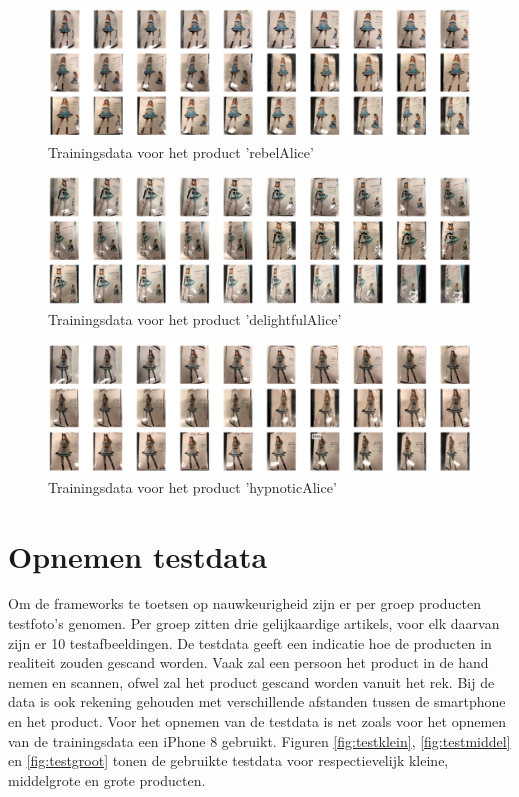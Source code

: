   \begin{figure}[h!]
    \centering
        \includegraphics[width=1\textwidth]{img/rebelAlice.png}
    \caption{Trainingsdata voor het product 'rebelAlice'}
    \label{fig:rebelAlice}
  \end{figure}

  \begin{figure}[h!]
    \centering
        \includegraphics[width=1\textwidth]{img/delightfulAlice.png}
    \caption{Trainingsdata voor het product 'delightfulAlice'}
    \label{fig:delightfulAlice}
  \end{figure}

  \begin{figure}[h!]
    \centering
        \includegraphics[width=1\textwidth]{img/hypnoticAlice.png}
    \caption{Trainingsdata voor het product 'hypnoticAlice'}
    \label{fig:hypnoticAlice}
  \end{figure}

  \section{Opnemen testdata}
  \label{sec:Opnemen testdata}

  Om de frameworks te toetsen op nauwkeurigheid zijn er per groep producten testfoto’s genomen. Per groep zitten drie gelijkaardige artikels, voor elk daarvan zijn er 10 testafbeeldingen. De testdata geeft een indicatie hoe de producten in realiteit zouden gescand worden. Vaak zal een persoon het product in de hand nemen en scannen, ofwel zal het product gescand worden vanuit het rek. Bij de data is ook rekening gehouden met verschillende afstanden tussen de smartphone en het product. Voor het opnemen van de testdata is net zoals voor het opnemen van de trainingsdata een iPhone 8 gebruikt.
  Figuren \ref{fig:testklein}, \ref{fig:testmiddel} en \ref{fig:testgroot} tonen de gebruikte testdata voor respectievelijk kleine, middelgrote en grote producten. 

